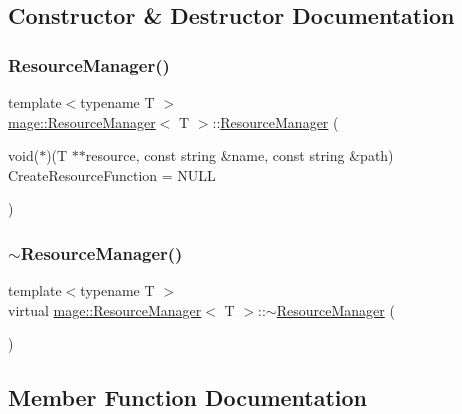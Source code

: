 \subsection{Constructor \& Destructor Documentation}
\hypertarget{classmage_1_1_resource_manager_aad8d61f96551b9ddd59593ed52eac241}{}\label{classmage_1_1_resource_manager_aad8d61f96551b9ddd59593ed52eac241} 
\subsubsection{\texorpdfstring{Resource\+Manager()}{ResourceManager()}}
{\footnotesize\ttfamily template$<$typename T $>$ \\
\hyperlink{classmage_1_1_resource_manager}{mage\+::\+Resource\+Manager}$<$ T $>$\+::\hyperlink{classmage_1_1_resource_manager}{Resource\+Manager} (\begin{DoxyParamCaption}\item[{void($\ast$)(T $\ast$$\ast$resource, const string \&name, const string \&path)}]{Create\+Resource\+Function = {\ttfamily NULL} }\end{DoxyParamCaption})}

\hypertarget{classmage_1_1_resource_manager_af3b6bf56e57bd3df0eb569510dd1483b}{}\label{classmage_1_1_resource_manager_af3b6bf56e57bd3df0eb569510dd1483b} 
\subsubsection{\texorpdfstring{$\sim$\+Resource\+Manager()}{~ResourceManager()}}
{\footnotesize\ttfamily template$<$typename T $>$ \\
virtual \hyperlink{classmage_1_1_resource_manager}{mage\+::\+Resource\+Manager}$<$ T $>$\+::$\sim$\hyperlink{classmage_1_1_resource_manager}{Resource\+Manager} (\begin{DoxyParamCaption}{ }\end{DoxyParamCaption})\hspace{0.3cm}{\ttfamily [virtual]}}



\subsection{Member Function Documentation}
\hypertarget{classmage_1_1_resource_manager_a874e36ac94e4c2063833a5f858a79a04}{}\label{classmage_1_1_resource_manager_a874e36ac94e4c2063833a5f858a79a04} 
